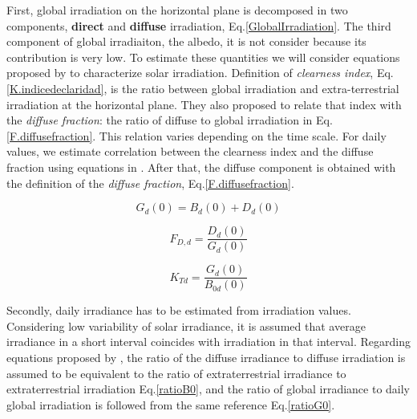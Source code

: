 First, global irradiation on the horizontal plane is decomposed in two components, \textbf{direct} and \textbf{diffuse} irradiation, Eq.\ref{GlobalIrradiation}. The third component of global irradiaiton, the albedo, it is  not consider because its contribution is very low. To estimate these quantities we will consider equations proposed by \cite{Liu1960} to characterize solar irradiation. Definition of \textit{clearness index}, Eq.\ref{K.indicedeclaridad}, is the ratio between global irradiation and extra-terrestrial irradiation at the horizontal plane. They also proposed to relate that index with the \textit{diffuse fraction}: the ratio of diffuse to global irradiation in Eq.\ref{F.diffusefraction}. This relation varies depending on the time scale. For daily values, we estimate correlation between the clearness index and the diffuse fraction using equations in \cite{Aguiar1992}. After that, the diffuse component is obtained with the definition of the \textit{diffuse fraction}, Eq.\ref{F.diffusefraction}.

\begin{equation}\label{GlobalIrradiation}
G_{d}(0) = B_{d}(0) + D_{d}(0)
\end{equation}



\begin{equation}\label{F.diffusefraction}
F_{D,d}=\frac{D_{d}(0)}{G_{d}(0)}
\end{equation}

\begin{equation}\label{K.indicedeclaridad}
K_{Td}=\frac{G_d(0)}{B_{0d}(0)}
\end{equation}

Secondly, daily irradiance has to be estimated from irradiation values. Considering low variability of solar irradiance, it is assumed that average irradiance in a short interval coincides with irradiation in that interval. Regarding equations proposed by \cite{Aguiar1992}, the ratio of the diffuse irradiance to diffuse irradiation is assumed to be equivalent to the ratio of extraterrestrial irradiance to extraterrestrial irradiation Eq.\ref{ratioB0}, and the ratio of global irradiance to daily global irradiation is followed from the same reference Eq.\ref{ratioG0}. 

